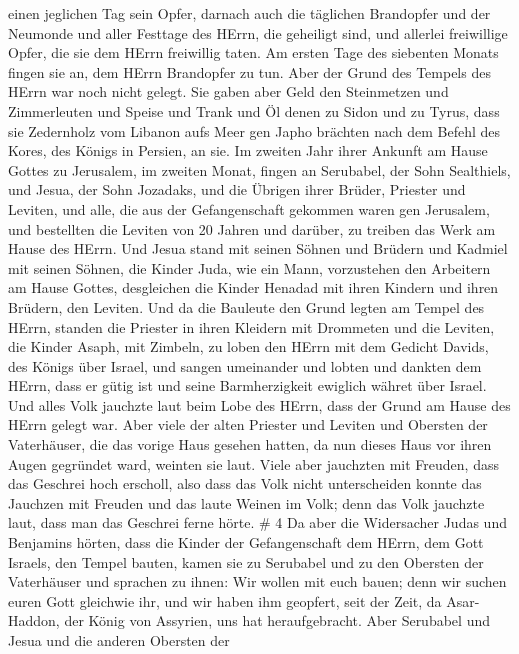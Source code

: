 einen jeglichen Tag sein Opfer,  darnach auch die täglichen
Brandopfer und der Neumonde und aller Festtage des HErrn, die geheiligt
sind, und allerlei freiwillige Opfer, die sie dem HErrn freiwillig
taten.  Am ersten Tage des siebenten Monats fingen sie an,
dem HErrn Brandopfer zu tun. Aber der Grund des Tempels des HErrn war
noch nicht gelegt.  Sie gaben aber Geld den Steinmetzen und
Zimmerleuten und Speise und Trank und Öl denen zu Sidon und zu Tyrus,
dass sie Zedernholz vom Libanon aufs Meer gen Japho brächten nach dem
Befehl des Kores, des Königs in Persien, an sie.  Im zweiten
Jahr ihrer Ankunft am Hause Gottes zu Jerusalem, im zweiten Monat,
fingen an Serubabel, der Sohn Sealthiels, und Jesua, der Sohn Jozadaks,
und die Übrigen ihrer Brüder, Priester und Leviten, und alle, die aus
der Gefangenschaft gekommen waren gen Jerusalem, und bestellten die
Leviten von 20 Jahren und darüber, zu treiben das Werk am Hause des
HErrn.  Und Jesua stand mit seinen Söhnen und Brüdern und
Kadmiel mit seinen Söhnen, die Kinder Juda, wie ein Mann, vorzustehen
den Arbeitern am Hause Gottes, desgleichen die Kinder Henadad mit ihren
Kindern und ihren Brüdern, den Leviten.  Und da die
Bauleute den Grund legten am Tempel des HErrn, standen die Priester in
ihren Kleidern mit Drommeten und die Leviten, die Kinder Asaph, mit
Zimbeln, zu loben den HErrn mit dem Gedicht Davids, des Königs über
Israel,  und sangen umeinander und lobten und dankten dem
HErrn, dass er gütig ist und seine Barmherzigkeit ewiglich währet über
Israel. Und alles Volk jauchzte laut beim Lobe des HErrn, dass der Grund
am Hause des HErrn gelegt war.  Aber viele der alten
Priester und Leviten und Obersten der Vaterhäuser, die das vorige Haus
gesehen hatten, da nun dieses Haus vor ihren Augen gegründet ward,
weinten sie laut. Viele aber jauchzten mit Freuden, dass das Geschrei
hoch erscholl,  also dass das Volk nicht unterscheiden
konnte das Jauchzen mit Freuden und das laute Weinen im Volk; denn das
Volk jauchzte laut, dass man das Geschrei ferne hörte. \# 4 
Da aber die Widersacher Judas und Benjamins hörten, dass die Kinder der
Gefangenschaft dem HErrn, dem Gott Israels, den Tempel bauten,
 kamen sie zu Serubabel und zu den Obersten der Vaterhäuser
und sprachen zu ihnen: Wir wollen mit euch bauen; denn wir suchen euren
Gott gleichwie ihr, und wir haben ihm geopfert, seit der Zeit, da
Asar-Haddon, der König von Assyrien, uns hat heraufgebracht.
 Aber Serubabel und Jesua und die anderen Obersten der

